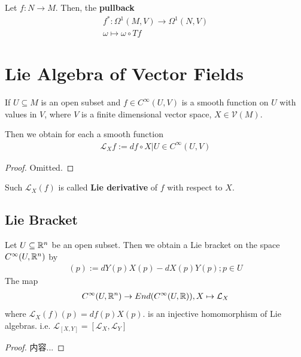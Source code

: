 \documentclass[Total.tex]{subfiles}
\begin{document}
			\begin{Def}
				Let $f:N\rightarrow M$. Then, the \textbf{pullback}
				\begin{gather*}
					f^*:\Omega^1(M,V)\rightarrow \Omega^1(N,V)\\
					\omega\mapsto \omega\circ Tf
				\end{gather*}
			\end{Def}
			
		\section{Lie Algebra of Vector Fields}
			\begin{lemma}
				If $U\subseteq M$ is an open subset and $f\in C^\infty(U,V)$ is a smooth function on $U$ with values in $V$, where $V$ is a finite dimensional vector space, $X\in \mathcal{V}(M)$.
				
				Then we obtain for each a smooth function
				\begin{gather*}
					\mathcal{L}_X f:=df\circ X|U\in C^\infty(U,V)
				\end{gather*} 
			\end{lemma}
			\begin{proof}
				Omitted.
			\end{proof}
			
			\begin{Def}
				Such $\mathcal{L}_X(f)$ is called \textbf{Lie derivative} of $f$ with respect to $X$.
			\end{Def}
			\subsection{Lie Bracket}
			
			\begin{lemma}
				Let $U\subseteq \mathbb{R}^n$ be an open subset. Then we obtain a Lie bracket on the space $C^\infty(U,\mathbb{R}^n)$ by
				\begin{gather*}
					[X,Y](p):=dY(p)X(p)-dX(p)Y(p);p\in U
				\end{gather*}
				The map
				\begin{gather*}
					C^\infty(U,\mathbb{R}^n)\rightarrow End(C^\infty(U,\mathbb{R})),X\mapsto \mathcal{L}_X
				\end{gather*}
				where $\mathcal{L}_X(f)(p)=df(p)X(p)$. is an injective homomorphism of Lie algebras. i.e. $\mathcal{L}_{[X,Y]}=[\mathcal{L}_X,\mathcal{L}_Y]$
			\end{lemma}
			\begin{proof}
				内容...
			\end{proof}
			
\end{document}
